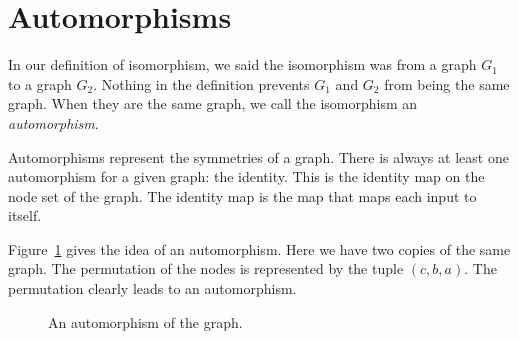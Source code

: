 \documentclass{iansnotes}
\begin{document}
\section{Automorphisms}
  In our definition of isomorphism, we said the isomorphism was from a graph $G_1$ to a graph $G_2$.
  Nothing in the definition prevents $G_1$ and $G_2$ from being the same graph.
  When they are the same graph, we call the isomorphism an \emph{automorphism}.

  Automorphisms represent the symmetries of a graph.
  There is always at least one automorphism for a given graph: the identity.
  This is the identity map on the node set of the graph.
  The identity map is the map that maps each input to itself.

  Figure~\ref{figure:autmorphism} gives the idea of an automorphism.
  Here we have two copies of the same graph.
  The permutation of the nodes is represented by the tuple $(c,b,a)$.
  The permutation clearly leads to an automorphism.

  \begin{figure}
    \centering
    \caption{An automorphism of the graph.}
    \label{figure:autmorphism}
  \end{figure}
\end{document}
